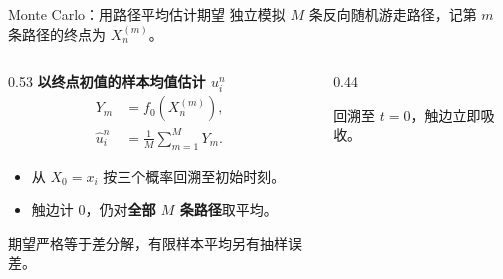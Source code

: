 \documentclass[UTF8,aspectratio=169,10pt]{ctexbeamer}
\begin{document}
\begin{frame}{Monte Carlo：用路径平均估计期望}
独立模拟 $M$ 条反向随机游走路径，记第 $m$ 条路径的终点为 $X_n^{(m)}$。
\medskip
\begin{columns}[T,onlytextwidth]
\begin{column}{0.53\textwidth}
\textbf{以终点初值的样本均值估计 $u_i^n$}
\[
\begin{aligned}
Y_m&=f_0(X_n^{(m)}),\\
\widehat u_i^n&=\textstyle\frac1M\sum_{m=1}^{M}Y_m.
\end{aligned}
\]
\begin{itemize}
\item 从 $X_0=x_i$ 按三个概率回溯至初始时刻。
\item 触边计 $0$，仍对\textbf{全部 $M$ 条路径}取平均。
\end{itemize}
{\small 期望严格等于差分解，有限样本平均另有抽样误差。}
\end{column}
\begin{column}{0.44\textwidth}
\centering
\par\smallskip
{\scriptsize 回溯至 $t=0$，触边立即吸收。}
\end{column}
\end{columns}
\end{frame}
\end{document}
